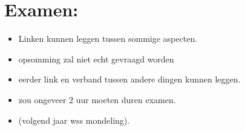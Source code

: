 \documentclass[12pt]{article}
\begin{document}
\section{Examen:}
\begin{itemize}
    \item Linken kunnen leggen tussen sommige aspecten.
    \item opsomming zal niet echt gevraagd worden 
    \item eerder link en verband tussen andere dingen kunnen leggen.
    \item zou ongeveer 2 uur moeten duren examen.
    \item (volgend jaar wss mondeling).
\end{itemize}
\end{document}
